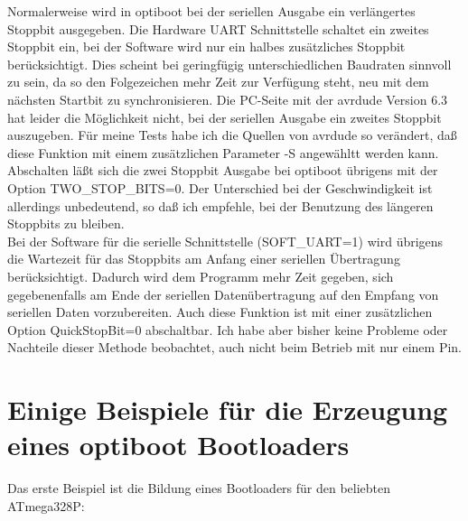 Normalerweise wird in optiboot bei der seriellen Ausgabe ein verlängertes Stoppbit ausgegeben.
Die Hardware UART Schnittstelle schaltet ein zweites Stoppbit ein, bei der Software wird
nur ein halbes zusätzliches Stoppbit berücksichtigt.
Dies scheint bei geringfügig unterschiedlichen Baudraten sinnvoll zu sein, da so den
Folgezeichen mehr Zeit zur Verfügung steht, neu mit dem nächsten Startbit zu synchronisieren.
Die PC-Seite mit der avrdude Version 6.3 hat leider die Möglichkeit nicht, bei
der seriellen Ausgabe ein zweites Stoppbit auszugeben.
Für meine Tests habe ich die Quellen von avrdude so verändert, daß diese Funktion mit
einem zusätzlichen Parameter -S angewähltt werden kann.
Abschalten läßt sich die zwei Stoppbit Ausgabe bei optiboot übrigens mit der Option TWO\_STOP\_BITS=0.
Der Unterschied bei der Geschwindigkeit ist allerdings unbedeutend, so daß ich empfehle,
bei der Benutzung des längeren Stoppbits zu bleiben.\\

Bei der Software für die serielle Schnittstelle (SOFT\_UART=1) wird übrigens die Wartezeit
für das Stoppbits am Anfang einer seriellen Übertragung berücksichtigt.
Dadurch wird dem Programm mehr Zeit gegeben,
sich gegebenenfalls am Ende der seriellen Datenübertragung auf den Empfang von
seriellen Daten vorzubereiten. Auch diese Funktion ist mit einer zusätzlichen Option
QuickStopBit=0 abschaltbar. Ich habe aber bisher keine Probleme oder Nachteile
dieser Methode beobachtet, auch nicht beim Betrieb mit nur einem Pin.


\section{Einige Beispiele für die Erzeugung eines optiboot Bootloaders}\label{Examples}

Das erste Beispiel ist die Bildung eines Bootloaders für den beliebten ATmega328P:

